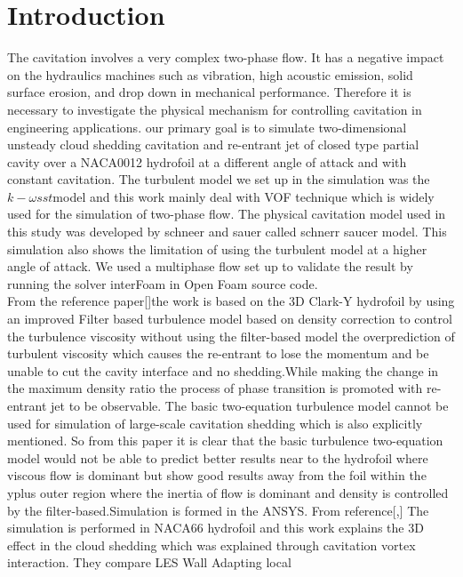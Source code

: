 \chapter*{Introduction}
\label{chap:introduction}
\renewcommand{\thepage}{\arabic{page}}
The cavitation involves a very complex two-phase flow. It has a negative impact on the hydraulics machines such as vibration, high acoustic emission, solid surface erosion, and drop down 
in mechanical performance. Therefore it is necessary to investigate the physical mechanism for controlling cavitation in engineering applications. our primary goal is to simulate two-dimensional unsteady cloud shedding cavitation and re-entrant jet of closed type partial cavity
over a NACA0012 hydrofoil at a different angle of attack and with constant cavitation. The turbulent model we set up in the simulation was the $k- {\omega}sst$model and this work mainly deal with 
VOF technique which is widely used for the simulation of two-phase flow. The physical cavitation model used in this study was developed by schneer and sauer called schnerr  saucer model. This simulation also shows the limitation 
of using the turbulent model at a higher angle of attack. We used a multiphase flow set up to validate the result by running the solver interFoam in Open Foam source code.\\
From the reference paper[\cite{ZHANG2017}]the work is based on the 3D Clark-Y hydrofoil by using an improved Filter based turbulence model based on density correction to control the turbulence viscosity  without using the filter-based model the overprediction of 
turbulent viscosity which causes the re-entrant to lose the momentum and be unable to cut the cavity interface and no shedding.While making the change in the maximum density ratio the process of phase transition 
is promoted with re-entrant jet to be observable. The basic two-equation turbulence model cannot be used for simulation of large-scale cavitation shedding which is also explicitly mentioned. So from this paper 
it is clear that the basic turbulence two-equation model would not be able to predict better results near to the hydrofoil where viscous flow is dominant but show  good results away from the foil within the yplus outer region where the inertia of flow is dominant
and density is controlled by the filter-based.Simulation is formed in the ANSYS.
From reference[\cite{JI2015},\cite{JI2017}]
The simulation is performed in NACA66 hydrofoil and this work explains the 3D effect in the cloud shedding which was explained through cavitation vortex interaction. They compare LES Wall Adapting local

